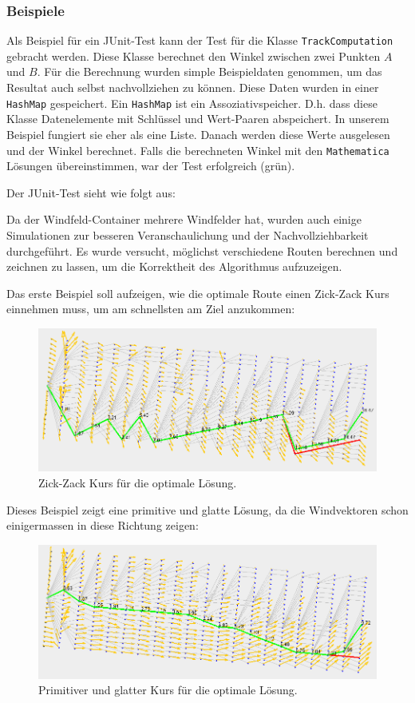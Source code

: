 \subsubsection{Beispiele}
Als Beispiel für ein JUnit-Test kann der Test für die Klasse
\texttt{TrackComputation} gebracht werden. Diese Klasse berechnet den Winkel
zwischen zwei Punkten $A$ und $B$. Für die Berechnung wurden simple
Beispieldaten genommen, um das Resultat auch selbst nachvollziehen zu können.
Diese Daten wurden in einer \texttt{HashMap} gespeichert. Ein \texttt{HashMap}
ist ein Assoziativspeicher.  D.h. dass diese Klasse Datenelemente mit
Schlüssel und Wert-Paaren abspeichert. In unserem Beispiel fungiert sie eher
als eine Liste.  Danach werden diese Werte ausgelesen und der Winkel
berechnet. Falls die berechneten Winkel mit den \texttt{Mathematica} Lösungen
übereinstimmen, war der Test erfolgreich (grün).

Der JUnit-Test sieht wie folgt aus:



Da der Windfeld-Container mehrere Windfelder hat, wurden auch einige Simulationen 
zur besseren Veranschaulichung und der Nachvollziehbarkeit durchgeführt. Es wurde versucht,
möglichst verschiedene Routen berechnen und zeichnen zu lassen, um die Korrektheit des
Algorithmus aufzuzeigen. 

Das erste Beispiel soll aufzeigen, wie die optimale Route einen Zick-Zack Kurs einnehmen muss,
um am schnellsten am Ziel anzukommen:

\begin{figure}[h!]
\centering
\includegraphics[width=0.8\linewidth]{img/gridNet_1}
\caption{Zick-Zack Kurs für die optimale Lösung.}
\label{gridnet1}
\end{figure}

Dieses Beispiel zeigt eine primitive und glatte Lösung, da die Windvektoren
schon einigermassen in diese Richtung zeigen:

\begin{figure}[h!]
\centering
\includegraphics[width=0.8\linewidth]{img/gridNet_2}
\caption{Primitiver und glatter Kurs für die optimale Lösung.}
\label{gridnet2}
\end{figure}

